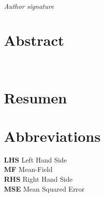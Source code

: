 \documentclass[openany]{article}
\begin{document}
    \lipsum[1]
    
    \mbox{}\par 
    \vspace{0.5cm}
    
    \begin{flushright}
        \textit{Author signature}
    \end{flushright}


\clearpage\thispagestyle{empty}\null\newpage %

\newpage
\thispagestyle{plain}

\section*{Abstract}

    \lipsum[1]\\
    
    \vspace{2cm}
    
\section*{Resumen}

    \lipsum[1]
    
%

\clearpage\thispagestyle{empty}\null\newpage %

\newpage
\thispagestyle{plain}

\section*{Abbreviations}

\textbf{LHS} Left Hand Side \\

\textbf{MF} Mean-Field \\

\textbf{RHS} Right Hand Side \\

\textbf{MSE} Mean Squared Error

\clearpage\thispagestyle{empty}\null\newpage %

\newpage
\thispagestyle{plain}
{
\hypersetup{hidelinks}
\tableofcontents
}


\thispagestyle{empty}

\clearpage\thispagestyle{empty}\null\newpage %


\newpage


\newpage


\newpage


\newpage


\newpage


\newpage


\newpage


\newpage

\end{document}

